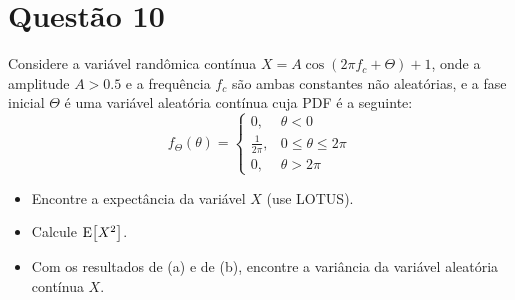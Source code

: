 \section{Questão 10}
Considere a variável randômica contínua 
$X = A\cos(2\pi f_c + \Theta) + 1$, 
onde a amplitude $A > 0.5$ e a frequência $f_c$ são ambas constantes não aleatórias, 
e a fase inicial $\Theta$ é uma variável aleatória contínua cuja
PDF é a seguinte:
%
\begin{equation*}
    f_\Theta(\theta) = 
    \begin{cases}
        0,              & \theta < 0 \\
        \frac{1}{2\pi}, & 0 \leq \theta \leq 2\pi \\
        0,              & \theta > 2\pi
    \end{cases}
\end{equation*}

\begin{itemize}
    \item [a)] Encontre a expectância da variável $X$ (use LOTUS).
    \item [b)] Calcule $\mathrm{E}\!\left[X^2\right]$.
    \item [c)] Com os resultados de (a) e de (b), encontre a variância da variável aleatória contínua $X$.
\end{itemize}

\respostas


